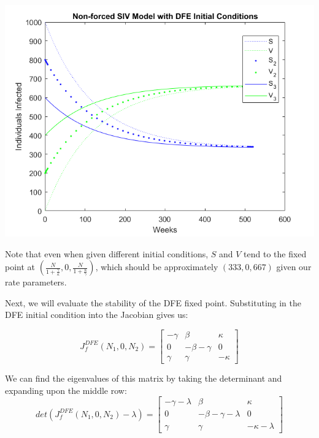 \documentclass[12pt]{article}
\newenvironment{Figure}
  {\par\medskip\noindent\minipage{\linewidth}}
  {\endminipage\par\medskip}
\begin{document}
\begin{Figure}
    \centering
    \includegraphics[width = \linewidth]{example_nonForced_siv_DFE.png}
\end{Figure}

Note that even when given different initial conditions, $S$ and $V$ tend to the fixed point at $(\frac{N}{1 + \frac{\gamma}{\kappa}}, 0, \frac{N}{1 + \frac{\kappa}{\gamma}})$, which should be approximately $(333, 0, 667)$ given our rate parameters.

Next, we will evaluate the stability of the DFE fixed point. Substituting in the DFE initial condition into the Jacobian gives us:

$$
J_f^{DFE}(N_1, 0, N_2) = \begin{bmatrix}
-\gamma & \beta & \kappa \\
0 & - \beta - \gamma & 0 \\
\gamma & \gamma & -\kappa
\end{bmatrix}
$$

We can find the eigenvalues of this matrix by taking the determinant and expanding upon the middle row:
$$
det(J_f^{DFE}(N_1, 0, N_2) - \lambda) = \begin{bmatrix}
-\gamma - \lambda & \beta & \kappa \\
0 & - \beta - \gamma - \lambda & 0 \\
\gamma & \gamma & -\kappa - \lambda
\end{bmatrix}
$$
\end{document}
